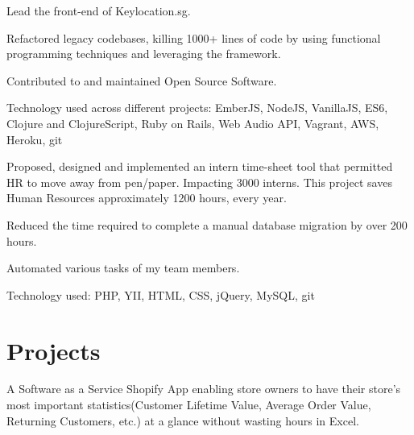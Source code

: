 \documentclass[letterpaper]{deedy-resume} %
\begin{document}
\begin{tightitemize}
    \item Lead the front-end of Keylocation.sg.
    \item Refactored legacy codebases, killing 1000+ lines of code by using functional programming techniques and leveraging the framework.
    \item Contributed to and maintained Open Source Software.
    \item Technology used across different projects: EmberJS, NodeJS, VanillaJS, ES6, Clojure and ClojureScript, Ruby on Rails, Web Audio API, Vagrant, AWS, Heroku, git
\end{tightitemize}

\sectionspace %


\begin{tightitemize}
\item Proposed, designed and implemented an intern time-sheet tool that
  permitted HR to move away from pen/paper. Impacting 3000 interns.
  This project saves Human Resources approximately 1200 hours, every year.
\item Reduced the time required to complete a manual database
  migration by over 200 hours.
\item Automated various tasks of my team members.
\item Technology used: PHP, YII, HTML, CSS, jQuery, MySQL, git
\end{tightitemize}

\sectionspace %


\section{Projects}


A Software as a Service Shopify App enabling store owners to have
their store's most important statistics(Customer Lifetime Value,
Average Order Value, Returning Customers, etc.) at a glance without
wasting hours in Excel.
\sectionspace
\end{document}
